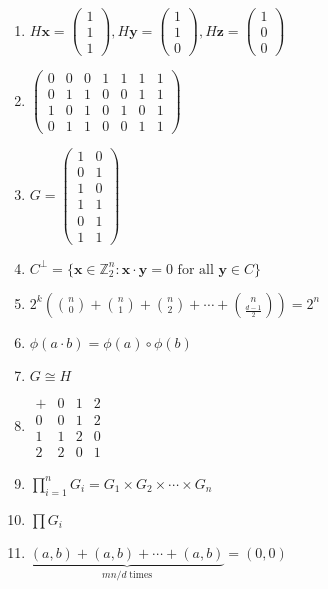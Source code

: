\documentclass[oneside,10pt,]{article}
\begin{document}
\begin{enumerate}
\item{}\(H{\mathbf x} = \begin{pmatrix} 1 \\ 1 \\ 1 \end{pmatrix}, H{\mathbf y} = \begin{pmatrix} 1 \\ 1 \\ 0 \end{pmatrix}, H{\mathbf z} = \begin{pmatrix} 1 \\ 0 \\ 0 \end{pmatrix}\)%
\item{}\(\begin{pmatrix} 0 & 0 & 0 & 1 & 1 & 1 & 1 \\ 0 & 1 & 1 & 0 & 0 & 1 & 1 \\ 1 & 0 & 1 & 0 & 1 & 0 & 1 \\ 0 & 1 & 1 & 0 & 0 & 1 & 1 \end{pmatrix}\)%
\item{}\(G = \begin{pmatrix} 1 & 0 \\ 0 & 1 \\ 1 & 0 \\ 1 & 1 \\ 0 & 1 \\ 1 & 1 \end{pmatrix}\)%
\item{}\(C^\perp = \{ {\mathbf x} \in {\mathbb Z}_2^n : {\mathbf x} \cdot {\mathbf y} = 0 \text{ for all } {\mathbf y} \in C \}\)%
\item{}\(2^k\left({n\choose 0} + {n\choose 1} + {n\choose 2} + \cdots + {n\choose \frac{d-1}{2}}\right) = 2^n\)%
\item{}\(\phi( a \cdot b) = \phi( a) \circ \phi( b)\)%
\item{}\(G \cong H\)%
\item{}\(\begin{array}{c|ccc} + & 0 & 1 & 2 \\ \hline 0 & 0 & 1 & 2 \\ 1 & 1 & 2 & 0 \\ 2 & 2 & 0 & 1 \end{array}\)%
\item{}\(\prod_{i = 1}^n G_i = G_1 \times G_2 \times \cdots \times G_n\)%
\item{}\(\prod G_i\)%
\item{}\(\underbrace{(a,b) + (a,b)+ \cdots + (a,b)}_{mn/d \; \text{times}} = (0, 0)\)%

\end{enumerate}
\end{document}
